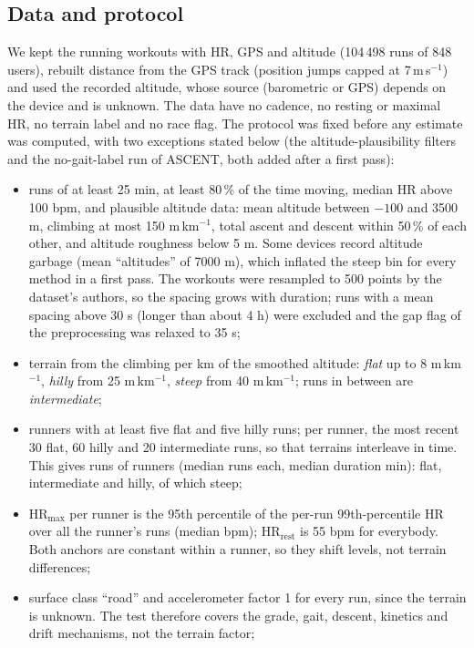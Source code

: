 \documentclass[11pt,a4paper]{article}
\newcommand{\HRmax}{\ensuremath{\mathrm{HR}_{\max}}}
\newcommand{\HRrest}{\ensuremath{\mathrm{HR}_{\mathrm{rest}}}}
\newcommand{\ascent}{ASCENT}
\begin{document}
\subsection{Data and protocol}
We kept the running workouts with HR, GPS and altitude (104\,498 runs of 848 users), rebuilt distance from the GPS track (position jumps capped at 7\,m\,s$^{-1}$) and used the recorded altitude, whose source (barometric or GPS) depends on the device and is unknown. The data have no cadence, no resting or maximal HR, no terrain label and no race flag. The protocol was fixed before any estimate was computed, with two exceptions stated below (the altitude-plausibility filters and the no-gait-label run of \ascent, both added after a first pass):
\begin{itemize}[leftmargin=*]
\item runs of at least 25 min, at least 80\,\% of the time moving, median HR above 100 bpm, and plausible altitude data: mean altitude between $-100$ and 3500 m, climbing at most 150 m\,km$^{-1}$, total ascent and descent within 50\,\% of each other, and altitude roughness below 5 m. Some devices record altitude garbage (mean ``altitudes'' of 7000 m), which inflated the steep bin for every method in a first pass. The workouts were resampled to 500 points by the dataset's authors, so the spacing grows with duration; runs with a mean spacing above 30 s (longer than about 4 h) were excluded and the gap flag of the preprocessing was relaxed to 35 s;
\item terrain from the climbing per km of the smoothed altitude: \emph{flat} up to 8 m\,km$^{-1}$, \emph{hilly} from 25 m\,km$^{-1}$, \emph{steep} from 40 m\,km$^{-1}$; runs in between are \emph{intermediate};
\item runners with at least five flat and five hilly runs; per runner, the most recent 30 flat, 60 hilly and 20 intermediate runs, so that terrains interleave in time. This gives \nnFitrecRuns{} runs of \nnFitrecRunners{} runners (median \nfitrecRunsPerRunner{} runs each, median duration \nfitrecDurMed{} min): \nnFitrecFlat{} flat, \nnFitrecMid{} intermediate and \nnFitrecHilly{} hilly, of which \nnFitrecSteep{} steep;
\item \HRmax{} per runner is the 95th percentile of the per-run 99th-percentile HR over all the runner's runs (median \nfitrecHrmaxMed{} bpm); \HRrest{} is 55 bpm for everybody. Both anchors are constant within a runner, so they shift levels, not terrain differences;
\item surface class ``road'' and accelerometer factor 1 for every run, since the terrain is unknown. The test therefore covers the grade, gait, descent, kinetics and drift mechanisms, not the terrain factor;

\end{itemize}
\end{document}
